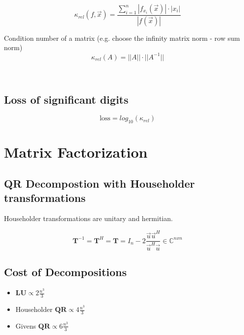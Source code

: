\documentclass[
    a4paper,
    11pt
]{article}
\begin{document}
\begin{equation}
    \kappa_{rel}(f, \vec{x}) =
    \frac{
        \sum_{i=1}^{n} \left| f_{x_i}(\vec{x}) \right| \cdot |x_i|
    } {
        \left| f(\vec{x}) \right|
    }
\end{equation}

Condition number of a matrix (e.g. choose the infinity matrix norm - row sum
norm)
\begin{equation}
    \kappa_{rel}(A) = ||A|| \cdot ||A^{-1}||
\end{equation}

\

\subsection{Loss of significant digits}

\begin{equation}
    \text{loss} = log_{10}(\kappa_{rel})
\end{equation}


\section{Matrix Factorization}

\subsection{QR Decompostion with Householder transformations}

Householder transformations are unitary and hermitian.

\begin{equation}
    \mathbf{T}^{-1} = \mathbf{T}^H = \mathbf{T} = I_n - 2
    \frac{\vec{u}\vec{u}^H}{\vec{u}^H\vec{u}} \in \mathbb{C}^{n x n}
\end{equation}

\subsection{Cost of Decompositions}

\begin{itemize}
    \item $\mathbf{LU} \propto 2\frac{n^3}{3}$
    \item Householder $\mathbf{QR} \propto 4\frac{n^3}{3}$
    \item Givens $\mathbf{QR} \propto 6\frac{n^3}{3}$

\end{itemize}
\end{document}
